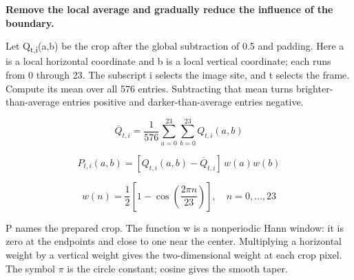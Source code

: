 \documentclass[11pt,letterpaper]{article}
\begin{document}
\textbf{Remove the local average and gradually reduce the influence of the boundary.}


Let Q\textsubscript{t,i}(a,b) be the crop after the global subtraction of 0.5 and padding. Here a is a local horizontal coordinate and b is a local vertical coordinate; each runs from 0 through 23. The subscript i selects the image site, and t selects the frame. Compute its mean over all 576 entries. Subtracting that mean turns brighter-than-average entries positive and darker-than-average entries negative.


\begin{equation}\overline Q_{t,i}=\frac{1}{576}\sum_{a=0}^{23}\sum_{b=0}^{23}Q_{t,i}(a,b)\end{equation}

\begin{equation}P_{t,i}(a,b)=[Q_{t,i}(a,b)-\overline Q_{t,i}]\,w(a)w(b)\end{equation}

\begin{equation}w(n)=\frac12\left[1-\cos\left(\frac{2\pi n}{23}\right)\right],\quad n=0,\ldots,23\end{equation}

P names the prepared crop. The function w is a nonperiodic Hann window: it is zero at the endpoints and close to one near the center. Multiplying a horizontal weight by a vertical weight gives the two-dimensional weight at each crop pixel. The symbol \(\pi\) is the circle constant; cosine gives the smooth taper.


\begin{center}\end{center}
\end{document}
